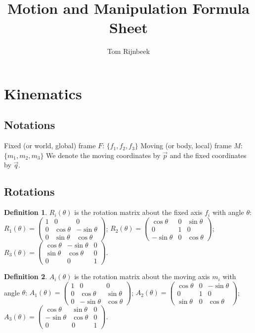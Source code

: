 \documentclass{article}
\title{Motion and Manipulation Formula Sheet}
\author{Tom Rijnbeek}
\theoremstyle{definition}
\newtheorem{definition}{Definition}[section]
\begin{document}
\section{Kinematics}

\subsection{Notations}
Fixed (or world, global) frame $F$: $\{f_1, f_2, f_3\}$\newline
Moving (or body, local) frame $M$: $\{m_1, m_2, m_3\}$\newline
We denote the moving coordinates by $\vec{p}$ and the fixed coordinates by $\vec{q}$.

\subsection{Rotations}
\begin{definition}
$R_i(\theta)$ is the rotation matrix about the fixed axis $f_i$ with angle $\theta$:\newline
$R_1(\theta) = 
\begin{pmatrix}
1 & 0 & 0 \\
0 & \cos \theta & -\sin \theta \\
0 & \sin \theta & \cos \theta
\end{pmatrix}$; 
$R_2(\theta) = 
\begin{pmatrix}
\cos \theta & 0 & \sin \theta \\
0 & 1 & 0 \\
-\sin \theta & 0 & \cos \theta
\end{pmatrix}$;\newline
$R_3(\theta) = 
\begin{pmatrix}
\cos \theta & -\sin \theta & 0 \\
\sin \theta & \cos \theta & 0 \\
0 & 0 & 1
\end{pmatrix}$.
\end{definition}

\begin{definition}
$A_i(\theta)$ is the rotation matrix about the moving axis $m_i$ with angle $\theta$:\newline
$A_1(\theta) = 
\begin{pmatrix}
1 & 0 & 0 \\
0 & \cos \theta & \sin \theta \\
0 & -\sin \theta & \cos \theta
\end{pmatrix}$; 
$A_2(\theta) = 
\begin{pmatrix}
\cos \theta & 0 & -\sin \theta \\
0 & 1 & 0 \\
\sin \theta & 0 & \cos \theta
\end{pmatrix}$;\newline
$A_3(\theta) = 
\begin{pmatrix}
\cos \theta & \sin \theta & 0 \\
-\sin \theta & \cos \theta & 0 \\
0 & 0 & 1
\end{pmatrix}$.
\end{definition}
\end{document}
